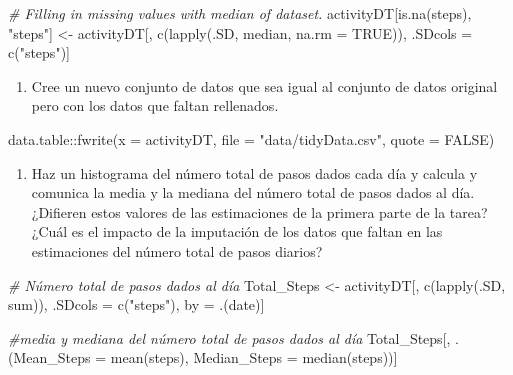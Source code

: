 \documentclass[
]{article}
\newenvironment{Shaded}{\begin{snugshade}}{\end{snugshade}}
\newcommand{\AttributeTok}[1]{\textcolor[rgb]{0.77,0.63,0.00}{#1}}
\newcommand{\CommentTok}[1]{\textcolor[rgb]{0.56,0.35,0.01}{\textit{#1}}}
\newcommand{\ConstantTok}[1]{\textcolor[rgb]{0.00,0.00,0.00}{#1}}
\newcommand{\FunctionTok}[1]{\textcolor[rgb]{0.00,0.00,0.00}{#1}}
\newcommand{\NormalTok}[1]{#1}
\newcommand{\OtherTok}[1]{\textcolor[rgb]{0.56,0.35,0.01}{#1}}
\newcommand{\SpecialCharTok}[1]{\textcolor[rgb]{0.00,0.00,0.00}{#1}}
\newcommand{\StringTok}[1]{\textcolor[rgb]{0.31,0.60,0.02}{#1}}
\providecommand{\tightlist}{%
  \setlength{\itemsep}{0pt}\setlength{\parskip}{0pt}}
\begin{document}
\begin{Shaded}
\begin{Highlighting}[]
\CommentTok{\# Filling in missing values with median of dataset. }
\NormalTok{activityDT[}\FunctionTok{is.na}\NormalTok{(steps), }\StringTok{"steps"}\NormalTok{] }\OtherTok{\textless{}{-}}\NormalTok{ activityDT[, }\FunctionTok{c}\NormalTok{(}\FunctionTok{lapply}\NormalTok{(.SD, median, }\AttributeTok{na.rm =} \ConstantTok{TRUE}\NormalTok{)), .SDcols }\OtherTok{=} \FunctionTok{c}\NormalTok{(}\StringTok{"steps"}\NormalTok{)]}
\end{Highlighting}
\end{Shaded}

\begin{enumerate}
\def\labelenumi{\arabic{enumi}.}
\setcounter{enumi}{2}
\tightlist
\item
  Cree un nuevo conjunto de datos que sea igual al conjunto de datos
  original pero con los datos que faltan rellenados.
\end{enumerate}

\begin{Shaded}
\begin{Highlighting}[]
\NormalTok{data.table}\SpecialCharTok{::}\FunctionTok{fwrite}\NormalTok{(}\AttributeTok{x =}\NormalTok{ activityDT, }\AttributeTok{file =} \StringTok{"data/tidyData.csv"}\NormalTok{, }\AttributeTok{quote =} \ConstantTok{FALSE}\NormalTok{)}
\end{Highlighting}
\end{Shaded}

\begin{enumerate}
\def\labelenumi{\arabic{enumi}.}
\setcounter{enumi}{3}
\tightlist
\item
  Haz un histograma del número total de pasos dados cada día y calcula y
  comunica la media y la mediana del número total de pasos dados al día.
  ¿Difieren estos valores de las estimaciones de la primera parte de la
  tarea? ¿Cuál es el impacto de la imputación de los datos que faltan en
  las estimaciones del número total de pasos diarios?
\end{enumerate}

\begin{Shaded}
\begin{Highlighting}[]
\CommentTok{\# Número total de pasos dados al día}
\NormalTok{Total\_Steps }\OtherTok{\textless{}{-}}\NormalTok{ activityDT[, }\FunctionTok{c}\NormalTok{(}\FunctionTok{lapply}\NormalTok{(.SD, sum)), .SDcols }\OtherTok{=} \FunctionTok{c}\NormalTok{(}\StringTok{"steps"}\NormalTok{), by }\OtherTok{=}\NormalTok{ .(date)] }

\CommentTok{\#media y mediana del número total de pasos dados al día}
\NormalTok{Total\_Steps[, .(}\AttributeTok{Mean\_Steps =} \FunctionTok{mean}\NormalTok{(steps), }\AttributeTok{Median\_Steps =} \FunctionTok{median}\NormalTok{(steps))]}
\end{Highlighting}
\end{Shaded}
\end{document}
